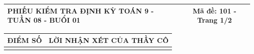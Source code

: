 \documentclass[12pt,a4paper]{article}
\begin{document}
\pagestyle{empty}

\noindent
\begin{tabularx}{\linewidth}{|X|c|}
\hline
\textbf{PHIẾU KIỂM TRA ĐỊNH KỲ TOÁN 9 - TUẦN 08 - BUỔI 01} & \textbf{Mã đề: 101 - Trang 1/2} \\
\hline
\end{tabularx}

\vspace{1.0mm}

\noindent
\begin{tabularx}{\linewidth}{|p{3.2cm}|X|}
\hline
\centering\textbf{ĐIỂM SỐ} & \centering\textbf{LỜI NHẬN XÉT CỦA THẦY CÔ} \tabularnewline
\hline
\rule{0pt}{1.8cm} & \tabularnewline
\hline
\end{tabularx}
\end{document}
